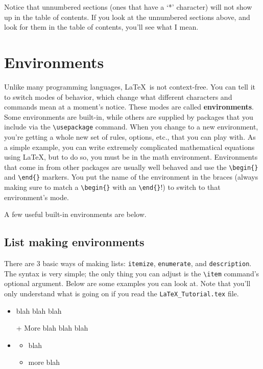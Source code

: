 \documentclass[letterpaper]{article}
\begin{document}
Notice that unnumbered sections (ones that have a `*' character) will 
not show up in the table of contents.  If you look at the unnumbered 
sections above, and look for them in the table of contents, you'll see 
what I mean.

\section{Environments}

Unlike many programming languages, \LaTeX\ is not context-free.  You can 
tell it to switch modes of behavior, which change what different 
characters and commands mean at a moment's notice. These modes are 
called \textbf{environments}.  Some environments are built-in, while 
others are supplied by packages that you include via the 
\verb+\usepackage+ command.  When you change to a new environment, 
you're getting a whole new set of rules, options, etc., that you can play 
with.  As a simple example, you can write extremely complicated 
mathematical equations using \LaTeX, but to do so, you must be in the 
math environment.  Environments that come in from other packages are 
usually well behaved and use the \verb+\begin{}+ and \verb+\end{}+ 
markers.  You put the name of the environment in the braces (always 
making sure to match a \verb+\begin{}+ with an \verb+\end{}+!) to switch 
to that environment's mode.

A few useful built-in environments are below.

\subsection{List making environments}

There are 3 basic ways of making lists: \verb+itemize+, 
\verb+enumerate+, and \verb+description+.  The syntax is very simple; 
the only thing you can adjust is the \verb+\item+ command's optional 
argument.  Below are some examples you can look at.  Note that you'll 
only understand what is going on if you read the 
\texttt{LaTeX\_Tutorial.tex} file.

\begin{itemize}
\item blah blah blah
\item[+]  More blah blah blah %
\item   \begin{itemize}
        \item blah
        \item more blah
        \end{itemize}
\end{itemize}
\end{document}
